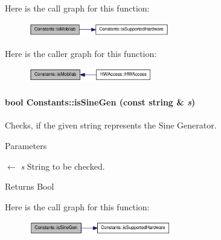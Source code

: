 Here is the call graph for this function:\nopagebreak
\begin{figure}[H]
\begin{center}
\leavevmode
\includegraphics[width=174pt]{class_constants_ac68da3efa9f4431daedf508f0577049e_cgraph}
\end{center}
\end{figure}


Here is the caller graph for this function:\nopagebreak
\begin{figure}[H]
\begin{center}
\leavevmode
\includegraphics[width=153pt]{class_constants_ac68da3efa9f4431daedf508f0577049e_icgraph}
\end{center}
\end{figure}
\hypertarget{class_constants_a2a0486841708b429d3a9ba6292702dd2}{
\paragraph[{isSineGen}]{\setlength{\rightskip}{0pt plus 5cm}bool Constants::isSineGen (const string \& {\em s})}\hfill}
\label{class_constants_a2a0486841708b429d3a9ba6292702dd2}


Checks, if the given string represents the Sine Generator. 
\begin{DoxyParams}{Parameters}
\item[\mbox{$\leftarrow$} {\em s}]String to be checked. \end{DoxyParams}
\begin{DoxyReturn}{Returns}
Bool 
\end{DoxyReturn}


Here is the call graph for this function:\nopagebreak
\begin{figure}[H]
\begin{center}
\leavevmode
\includegraphics[width=176pt]{class_constants_a2a0486841708b429d3a9ba6292702dd2_cgraph}
\end{center}
\end{figure}



